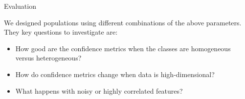 \documentclass[12pt]{pom_thesis}
\begin{document}
\begin{chapter}{Evaluation}


\hspace{1mm}

We designed populations using different combinations of the above parameters. They key questions to investigate are:
\begin{itemize}
    \item How good are the confidence metrics when the classes are homogeneous versus heterogeneous?
       \item How do confidence metrics change when data is high-dimensional?
    \item What happens with noisy or highly correlated features?
\end{itemize}


\end{chapter}
\end{document}
